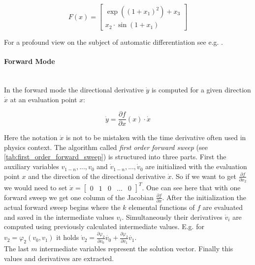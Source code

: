 \documentclass{scrartcl}[12pt, halfparskip]
\numberwithin{equation}{section}
\numberwithin{figure}{section}
\numberwithin{table}{section}
\begin{document}
\begin{equation}
F(x) = 
\begin{bmatrix}
\exp((1+x_1)^2) + x_3 \\
x_2 \cdot \sin(1+x_1)
\end{bmatrix}
\label{eq:AD_example}
\end{equation}

For a profound view on the subject of automatic differentiation see e.g. \cite{eval_derivatives_walther_griewank}.


\paragraph{Forward Mode}\mbox{}\\
In the forward mode the directional derivative $\dot{y}$ is computed for a given direction $\dot{x}$ at an evaluation point $x$:

\begin{equation}
\dot{y} = \frac{\partial f}{\partial x}(x) \cdot \dot{x}
\end{equation}

Here the notation $\dot{x}$ is not to be mistaken with the time derivative often used in physics context.
The algorithm called \textit{first order forward sweep} (see \cref{tab:first_order_forward_sweep}) is structured into three parts. First the auxiliary variables $v_{1-n},...,v_0$ and $\dot{v}_{1-n},...,\dot{v}_0$ are initialized with the evaluation point $x$ and the direction of the directional derivative $\dot{x}$. So if we want to get $\frac{\partial f}{\partial x_2}$ we would need to set $\dot{x} = \begin{bmatrix}
0 & 1 & 0 & \dots & 0
\end{bmatrix}^T$. One can see here that with one forward sweep we get one column of the Jacobian $ \frac{\partial f}{\partial x}$. 
After the initialization the actual forward sweep begins where the $k$ elemental functions of $f$ are evaluated and saved in the intermediate values $v_i$. Simultaneously their derivatives  $\dot{v}_i$ are computed using previously calculated intermediate values. E.g. for $v_2 = \varphi_2(v_0, v_1)$ it holds $\dot{v}_2 = \frac{\partial \varphi_2}{\partial v_0} \dot{v_0} + \frac{\partial \varphi_2}{\partial v_1} \dot{v_1}$. \\
The last $m$ intermediate variables represent the solution vector. Finally this values and derivatives are extracted.
\end{document}
